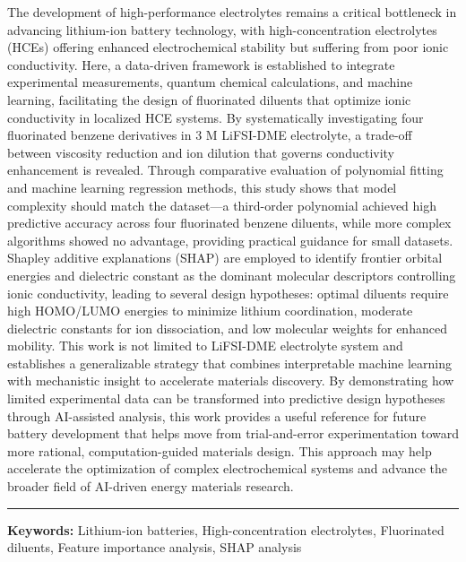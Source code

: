 \documentclass[11pt, a4paper]{article}
\newcommand{\paperkeywords}{Lithium-ion batteries, High-concentration electrolytes, Fluorinated diluents, Feature importance analysis, SHAP analysis}
\begin{document}
\noindent
{\small The development of high-performance electrolytes remains a critical bottleneck in advancing lithium-ion battery technology, with high-concentration electrolytes (HCEs) offering enhanced electrochemical stability but suffering from poor ionic conductivity. Here, a data-driven framework is established to integrate experimental measurements, quantum chemical calculations, and machine learning, facilitating the design of fluorinated diluents that optimize ionic conductivity in localized HCE systems. By systematically investigating four fluorinated benzene derivatives in 3 M LiFSI-DME electrolyte, a trade-off between viscosity reduction and ion dilution that governs conductivity enhancement is revealed. Through comparative evaluation of polynomial fitting and machine learning regression methods, this study shows that model complexity should match the dataset—a third-order polynomial achieved high predictive accuracy across four fluorinated benzene diluents, while more complex algorithms showed no advantage, providing practical guidance for small datasets. Shapley additive explanations (SHAP) are employed to identify frontier orbital energies and dielectric constant as the dominant molecular descriptors controlling ionic conductivity, leading to several design hypotheses: optimal diluents require high HOMO/LUMO energies to minimize lithium coordination, moderate dielectric constants for ion dissociation, and low molecular weights for enhanced mobility.
This work is not limited to LiFSI-DME electrolyte system and establishes a generalizable strategy that combines interpretable machine learning with mechanistic insight to accelerate materials discovery. By demonstrating how limited experimental data can be transformed into predictive design hypotheses through AI-assisted analysis, this work provides a useful reference for future battery development that helps move from trial-and-error experimentation toward more rational, computation-guided materials design. This approach may help accelerate the optimization of complex electrochemical systems and advance the broader field of AI-driven energy materials research.}

\vspace{0.2cm}
\noindent\rule{\textwidth}{0.4pt}

\vspace{0.2cm}
{\selectfont\footnotesize\color{aidergrey}
\textbf{Keywords:} \paperkeywords}

\vspace{0.6cm}
\end{document}
